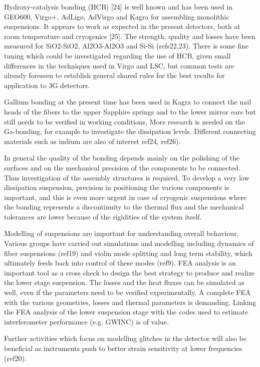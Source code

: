 Hydroxy-catalysis bonding (HCB) [24] is well known and has been used in GEO600, Virgo+, AdLigo, AdVirgo and Kagra for assembling monolithic suspensions.  It appears to work as expected in the present detectors, both at room temperature and cryogenics [25]. The strength, quality and losses have been measured for SiO2-SiO2, Al2O3-Al2O3 and Si-Si (refs22,23).   There is some fine tuning which could be investigated regarding the use of HCB, given small differences in the techniques used in Virgo and LSC, but common tests are already foreseen to establish general shared rules for the best results for application to 3G detectors.

Gallium bonding at the present time has been used in Kagra to connect the nail heads of the fibers to the upper Sapphire springs and to the lower mirror ears but still needs to be verified in working conditions,  More research is needed on the Ga-bonding, for example to  investigate the dissipation levels.  Different connecting materials such as indium are also of interest ref24, ref26). 

In general the quality of the bonding depends mainly on the polishing of the surfaces and on the mechanical precision of the components to be connected. Thus investigation of the assembly structures is required. To develop a very low dissipation suspension, precision in positioning the various components is important, and this is even more urgent in case of cryogenic suspensions where the bonding represents a discontinuity to the thermal flux and the mechanical tolerances are lower because of the rigidities of the system itself.



Modelling of suspensions are important for understanding overall behaviour. Various groups have carried out simulations and modelling including dynamics of fiber suspensions (ref19) and violin mode splitting and long term stability, which ultimately feeds back into control of these modes (ref9). FEA analysis is an important tool as a cross check to design the best strategy to produce and realize the lower stage suspension. The losses and the heat fluxes can be simulated as well, even if the parameters need to be verified experimentally. A complete FEA with the various geometries, losses and thermal parameters is demanding. Linking the FEA analysis of the lower suspension stage with the codes used to estimate interferometer performance (e.g. GWINC) is of value.

Further activities which focus on modelling glitches in the detector will also be beneficial as instruments push to better strain sensitivity at lower frequencies (ref20).

